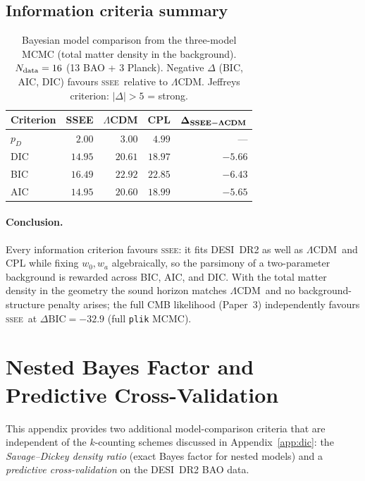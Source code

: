 \documentclass[12pt,a4paper]{article}
\newcommand{\SSEE}{\ifmmode\mathrm{SSEE}\else\textsc{ssee}\fi}
\newcommand{\LCDM}{\ifmmode\Lambda\mathrm{CDM}\else$\Lambda$CDM\fi}
\begin{document}
\subsection*{Information criteria summary}

\begin{table}[H]
\centering
\caption{%
  Bayesian model comparison from the three-model MCMC (total matter density in
  the background). $N_{\rm data}=16$ (13 BAO + 3 Planck). Negative $\Delta$
  (BIC, AIC, DIC) favours \SSEE\ relative to \LCDM.
  Jeffreys criterion: $|\Delta| > 5$ = strong.
}
\label{tab:bic_dic_rigorous}
\begin{tabular}{lrrrr}
\toprule
\textbf{Criterion} & \textbf{SSEE} & \textbf{\LCDM} & \textbf{CPL}
  & $\boldsymbol{\Delta_{\rm SSEE-\Lambda CDM}}$ \\
\midrule
$p_D$   & $2.00$  & $3.00$  & $4.99$  & — \\
DIC     & $14.95$ & $20.61$ & $18.97$ & $-5.66$ \\
BIC     & $16.49$ & $22.92$ & $22.85$ & $-6.43$ \\
AIC     & $14.95$ & $20.60$ & $18.99$ & $-5.65$ \\
\bottomrule
\end{tabular}
\end{table}

\paragraph{Conclusion.}
Every information criterion favours \SSEE: it fits DESI~DR2 as well as \LCDM\
and CPL while fixing $w_0,w_a$ algebraically, so the parsimony of a
two-parameter background is rewarded across BIC, AIC, and DIC. With the total
matter density in the geometry the sound horizon matches \LCDM\ and no
background-structure penalty arises; the full CMB likelihood (Paper~3)
independently favours \SSEE\ at $\Delta\mathrm{BIC}=-32.9$ (full \texttt{plik} MCMC).

\section{Nested Bayes Factor and Predictive Cross-Validation}
\label{app:sddr_cv}

This appendix provides two additional model-comparison criteria that
are independent of the $k$-counting schemes discussed in
Appendix~\ref{app:dic}: the \emph{Savage--Dickey density ratio} (exact
Bayes factor for nested models) and a \emph{predictive
cross-validation} on the DESI~DR2 BAO data.
\end{document}
